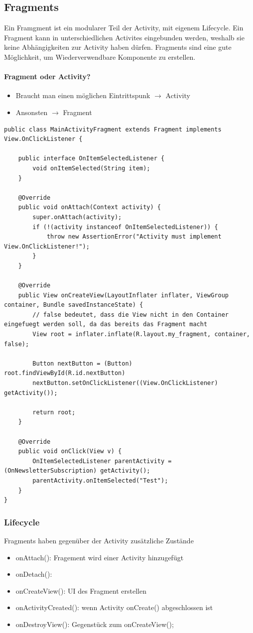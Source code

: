 \subsection{Fragments}
Ein Framgment ist ein modularer Teil der Activity, mit eigenem Lifecycle. Ein Fragment kann in unterschiedlichen Activites eingebunden werden, weshalb sie keine Abhängigkeiten zur Activity haben dürfen. Fragments sind eine gute Möglichkeit, um Wiederverwendbare Komponente zu erstellen. 

\paragraph{Fragment oder Activity?}
\begin{itemize}
	\item Braucht man einen möglichen Eintrittspunk $\rightarrow$ Activity
	\item Ansonsten $\rightarrow$ Fragment
\end{itemize}

\begin{lstlisting}[caption=Fragment]
public class MainActivityFragment extends Fragment implements View.OnClickListener {

	public interface OnItemSelectedListener {
		void onItemSelected(String item);
	}

	@Override
	public void onAttach(Context activity) {
		super.onAttach(activity);
		if (!(activity instanceof OnItemSelectedListener)) {
			throw new AssertionError("Activity must implement View.OnClickListener!");
		}
	}
		
	@Override
	public View onCreateView(LayoutInflater inflater, ViewGroup container, Bundle savedInstanceState) {
		// false bedeutet, dass die View nicht in den Container eingefuegt werden soll, da das bereits das Fragment macht
		View root = inflater.inflate(R.layout.my_fragment, container, false);
		
		Button nextButton = (Button) root.findViewById(R.id.nextButton)
		nextButton.setOnClickListener((View.OnClickListener) getActivity());
		
		return root;
	}	
	
	@Override
	public void onClick(View v) {
		OnItemSelectedListener parentActivity = (OnNewsletterSubscription) getActivity();
		parentActivity.onItemSelected("Test");
	}
}
\end{lstlisting}

\subsubsection{Lifecycle}
Fragments haben gegenüber der Activity zusätzliche Zustände
\begin{itemize}
	\item onAttach(): Fragement wird einer Activity hinzugefügt
	\item onDetach(): 
	\item onCreateView(): UI des Fragment erstellen
	\item onActivityCreated(): wenn Activity onCreate() abgeschlossen ist
	\item onDestroyView(): Gegenstück zum onCreateView();
\end{itemize}

